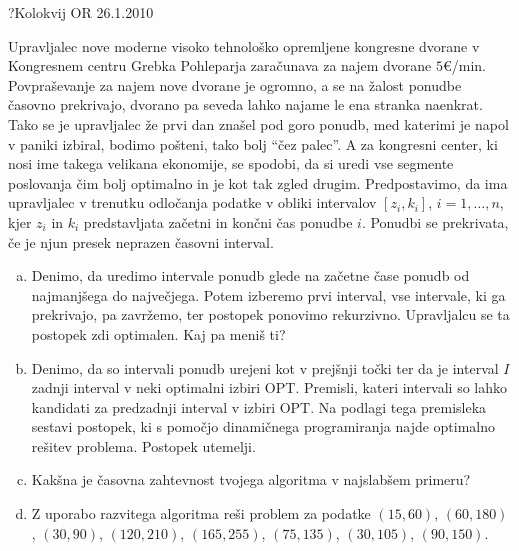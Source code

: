 \begin{naloga}{?}{Kolokvij OR 26.1.2010}
\begin{vprasanje}
Upravljalec nove moderne visoko tehnološko opremljene kongresne dvorane
v Kongresnem centru Grebka Pohleparja zaračunava za najem dvorane $5 €$/min.
Povpraševanje za najem nove dvorane je ogromno,
a se na žalost ponudbe časovno prekrivajo,
dvorano pa seveda lahko najame le ena stranka naenkrat.
Tako se je upravljalec že prvi dan znašel pod goro ponudb,
med katerimi je napol v paniki izbiral,
bodimo pošteni, tako bolj ``čez palec''.
A za kongresni center, ki nosi ime takega velikana ekonomije, se spodobi,
da si uredi vse segmente poslovanja čim bolj optimalno
in je kot tak zgled drugim.
Predpostavimo,
da ima upravljalec v trenutku odločanja podatke v obliki intervalov
$[z_i, k_i]$, $i = 1, \dots, n$,
kjer $z_i$ in $k_i$ predstavljata začetni in končni čas ponudbe $i$.
Ponudbi se prekrivata, če je njun presek neprazen časovni interval.

\begin{enumerate}[(a)]
\item Denimo, da uredimo intervale ponudb
glede na začetne čase ponudb od najmanjšega do največjega.
Potem izberemo prvi interval, vse intervale, ki ga prekrivajo, pa zavržemo,
ter postopek ponovimo rekurzivno.
Upravljalcu se ta postopek zdi optimalen. Kaj pa meniš ti?

\item Denimo, da so intervali ponudb urejeni kot v prejšnji točki
ter da je interval $I$ zadnji interval v neki optimalni izbiri OPT.
Premisli,
kateri intervali so lahko kandidati za predzadnji interval v izbiri OPT.
Na podlagi tega premisleka sestavi postopek,
ki s pomočjo dinamičnega programiranja najde optimalno rešitev problema.
Postopek utemelji.

\item Kakšna je časovna zahtevnost tvojega algoritma v najslabšem primeru?

\item Z uporabo razvitega algoritma reši problem za podatke
$(15, 60)$, $(60, 180)$, $(30, 90)$, $(120, 210)$,
$(165, 255)$, $(75, 135)$, $(30, 105)$, $(90, 150)$.
\end{enumerate}
\end{vprasanje}
\begin{odgovor}
\end{odgovor}
\end{naloga}


